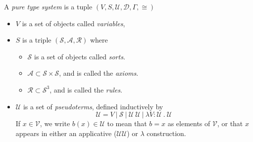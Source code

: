 
\begin{definition}\label{puretypesysdef}
    A \emph{pure type system} is a tuple $(V,S,\mathcal{U},\mathcal{D},\Gamma,\cong)$
    \begin{itemize}
        \item $V$ is a set of objects called \emph{variables},
        
        \item $S$ is a triple $(\mathcal{S},\mathcal{A},\mathcal{R})$ where
        \begin{itemize}
            \item $\mathcal{S}$ is a set of objects called \emph{sorts}.
            \item $\mathcal{A} \subset \mathcal{S}\times\mathcal{S}$, and is called the \emph{axioms}.
            \item $\mathcal{R} \subset \mathcal{S}^3$, and is called the \emph{rules}.
        \end{itemize}
        
        \item $\mathcal{U}$ is a set of \emph{pseudoterms}, defined inductively by 
            \begin{equation*}
                \mathcal{U} = V\ |\ \mathcal{S}\ |\ \mathcal{U}\ \mathcal{U}\ |\ \lambda V : \mathcal{U}\ .\ \mathcal{U}\  %
            \end{equation*}
        If $x \in \mathcal{V}$, we write $b(x) \in \mathcal{U}$ to mean that $b = x$ as elements of $\mathcal{V}$, or that $x$ appears in either an applicative ($\mathcal{U} \mathcal{U}$) or $\lambda$ construction.


\end{itemize}
\end{definition}
